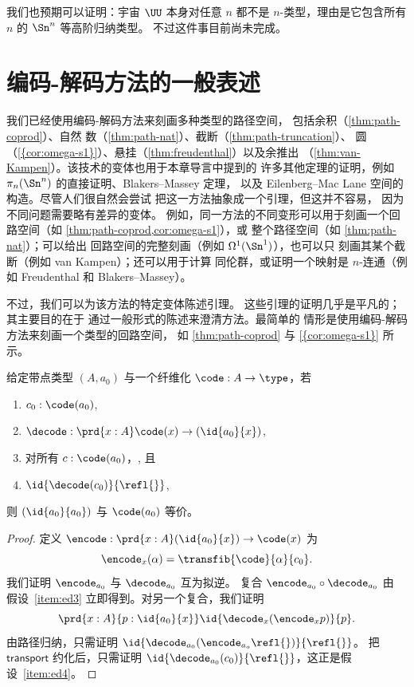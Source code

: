 我们也预期可以证明：宇宙 $\UU$ 本身对任意 $n$ 都不是 $n$-类型，理由是它包含所有 $n$ 的 $\Sn^n$ 等高阶归纳类型。
不过这件事目前尚未完成。
\section{编码-解码方法的一般表述}
\label{sec:general-encode-decode}


我们已经使用编码-解码方法来刻画多种类型的路径空间，
包括余积（\cref{thm:path-coprod}）、自然
数（\cref{thm:path-nat}）、截断（\cref{thm:path-truncation}）、
圆（\cref{{cor:omega-s1}}）、悬挂（\cref{thm:freudenthal}）以及余推出
（\cref{thm:van-Kampen}）。该技术的变体也用于本章导言中提到的
许多其他定理的证明，例如 $\pi_n(\Sn^n)$ 的直接证明、Blakers--Massey 定理，
以及 Eilenberg--Mac Lane 空间的构造。尽管人们很自然会尝试
把这一方法抽象成一个引理，但这并不容易，
因为不同问题需要略有差异的变体。
例如，同一方法的不同变形可以用于刻画一个回路空间（如 \cref{thm:path-coprod,cor:omega-s1}），或
整个路径空间（如 \cref{thm:path-nat}）；可以给出
回路空间的完整刻画（例如 $\Omega^1(\Sn ^1)$），也可以只
刻画其某个截断（例如 van Kampen）；还可以用于计算
同伦群，或证明一个映射是 $n$-连通（例如 Freudenthal 和
Blakers--Massey）。

不过，我们可以为该方法的特定变体陈述引理。
这些引理的证明几乎是平凡的；其主要目的在于
通过一般形式的陈述来澄清方法。最简单的
情形是使用编码-解码方法来刻画一个类型的回路空间，
如 \cref{thm:path-coprod} 与 \cref{{cor:omega-s1}} 所示。

\begin{lem}[回路空间的编码-解码]\label{lem:encode-decode-loop}
给定带点类型 $(A,a_0)$ 与一个纤维化
$\code : A \to \type$，若
\begin{enumerate}
\item $c_0 : \code(a_0)$,\label{item:ed1}
\item $\decode : \prd{x:A} \code(x) \to (\id{a_0}{x})$,\label{item:ed2}
\item 对所有 $c : \code(a_0)$，, 且\label{item:ed3}
\item $\id{\decode(c_0)}{\refl{}}$,\label{item:ed4}
\end{enumerate}
则 $(\id{a_0}{a_0})$ 与 $\code(a_0)$ 等价。
\end{lem}

\begin{proof}
定义
$\encode : \prd{x:A} (\id{a_0}{x}) \to \code(x)$ 为
\[
\encode_x(\alpha) = \transfib{\code}{\alpha}{c_0}.
\]
我们证明 $\encode_{a_0}$ 与 $\decode_{a_0}$ 互为拟逆。
复合 $\encode_{a_0} \circ \decode_{a_0}$ 由
假设~\ref{item:ed3} 立即得到。对另一个复合，我们证明
\[
\prd{x:A}{p : \id{a_0}{x}} \id{\decode_{x} (\encode_{x} p)}{p}.
\]
由路径归纳，只需证明
$\id{{\decode_{{a_0}} (\encode_{{a_o}} \refl{})}}{\refl{}}$。
把 $\mathsf{transport}$ 约化后，只需证明
$\id{{\decode_{{a_0}} (c_0)}}{\refl{}}$，这正是假设~\ref{item:ed4}。
\end{proof}

